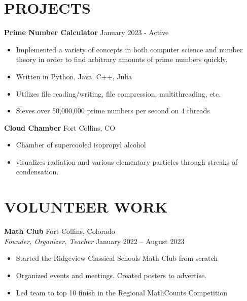 \documentclass[a4paper,12pt]{extarticle}
\begin{document}
\section*{PROJECTS}
\noindent
\textbf{Prime Number Calculator}  \hfill January 2023 - Active %


\begin{itemize}
\item Implemented a variety of concepts in both computer science and number theory in order to find arbitrary amounts of prime numbers quickly.
\item Written in Python, Java, C++, Julia
\item Utilizes file reading/writing, file compression, multithreading, etc. 
\item Sieves over 50,000,000 prime numbers per second on 4 threads

\end{itemize}

\noindent
\textbf{Cloud Chamber} \hfill Fort Collins, CO %
\begin{itemize}
    \item Chamber of supercooled isopropyl alcohol
    \item visualizes radiation and various elementary particles through streaks of condensation.
\end{itemize}

\section*{VOLUNTEER WORK}
\noindent
\textbf{Math Club} \hfill Fort Collins, Colorado\\ %
\textit{Founder, Organizer, Teacher} \hfill January 2022 – August 2023 %
\begin{itemize}
    \item Started the Ridgeview Classical Schools Math Club from scratch
    \item Organized events and meetings. Created posters to advertise.
    \item Led team to top 10 finish in the Regional MathCounts Competition
\end{itemize}
\end{document}

